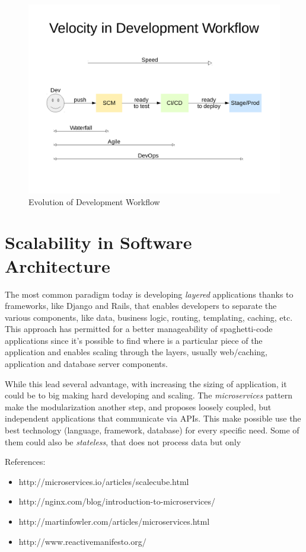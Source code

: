 \begin{figure}[htbp]
\centering
\includegraphics{media/ch2-devops.png}
\caption{Evolution of Development Workflow}
\end{figure}

\section{Scalability in Software
Architecture}\label{scalability-in-software-architecture}

The most common paradigm today is developing \emph{layered} applications
thanks to frameworks, like Django and Rails, that enables developers to
separate the various components, like data, business logic, routing,
templating, caching, etc. This approach has permitted for a better
manageability of spaghetti-code applications since it's possible to find
where is a particular piece of the application and enables scaling
through the layers, usually web/caching, application and database server
components.

While this lead several advantage, with increasing the sizing of
application, it could be to big making hard developing and scaling. The
\emph{microservices} pattern make the modularization another step, and
proposes loosely coupled, but independent applications that communicate
via APIs. This make possible use the best technology (language,
framework, database) for every specific need. Some of them could also be
\emph{stateless}, that does not process data but only

References:

\begin{itemize}
\itemsep1pt\parskip0pt
\item
  http://microservices.io/articles/scalecube.html
\item
  http://nginx.com/blog/introduction-to-microservices/
\item
  http://martinfowler.com/articles/microservices.html
\item
  http://www.reactivemanifesto.org/
\end{itemize}

